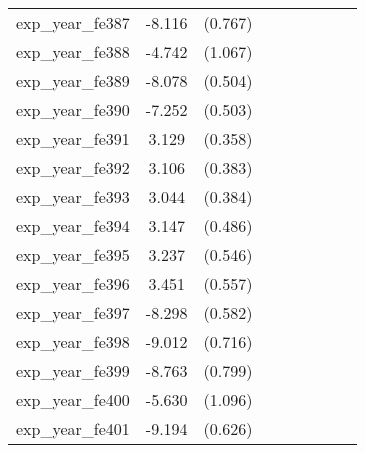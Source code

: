 {\begin{tabular}{l*{4}{cc}}
exp\_year\_fe387&   -8.116\sym{***}&  (0.767)&                  &         &                  &         &                  &         \\
exp\_year\_fe388&   -4.742\sym{***}&  (1.067)&                  &         &                  &         &                  &         \\
exp\_year\_fe389&   -8.078\sym{***}&  (0.504)&                  &         &                  &         &                  &         \\
exp\_year\_fe390&   -7.252\sym{***}&  (0.503)&                  &         &                  &         &                  &         \\
exp\_year\_fe391&    3.129\sym{***}&  (0.358)&                  &         &                  &         &                  &         \\
exp\_year\_fe392&    3.106\sym{***}&  (0.383)&                  &         &                  &         &                  &         \\
exp\_year\_fe393&    3.044\sym{***}&  (0.384)&                  &         &                  &         &                  &         \\
exp\_year\_fe394&    3.147\sym{***}&  (0.486)&                  &         &                  &         &                  &         \\
exp\_year\_fe395&    3.237\sym{***}&  (0.546)&                  &         &                  &         &                  &         \\
exp\_year\_fe396&    3.451\sym{***}&  (0.557)&                  &         &                  &         &                  &         \\
exp\_year\_fe397&   -8.298\sym{***}&  (0.582)&                  &         &                  &         &                  &         \\
exp\_year\_fe398&   -9.012\sym{***}&  (0.716)&                  &         &                  &         &                  &         \\
exp\_year\_fe399&   -8.763\sym{***}&  (0.799)&                  &         &                  &         &                  &         \\
exp\_year\_fe400&   -5.630\sym{***}&  (1.096)&                  &         &                  &         &                  &         \\
exp\_year\_fe401&   -9.194\sym{***}&  (0.626)&                  &         &                  &         &                  &         \\

\end{tabular}}
